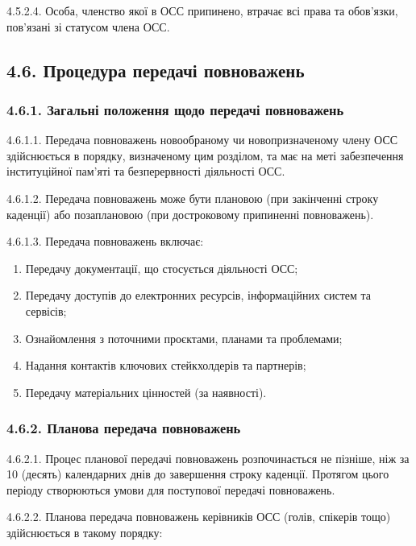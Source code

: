         4.5.2.4. Особа, членство якої в ОСС припинено, втрачає всі права та обов'язки, пов'язані зі статусом члена ОСС.

\subsection*{4.6. Процедура передачі повноважень}
    \subsubsection*{4.6.1. Загальні положення щодо передачі повноважень}
        4.6.1.1. Передача повноважень новообраному чи новопризначеному члену ОСС здійснюється в порядку, визначеному цим розділом, та має на меті забезпечення інституційної пам'яті та безперервності діяльності ОСС.
        
        4.6.1.2. Передача повноважень може бути плановою (при закінченні строку каденції) або позаплановою (при достроковому припиненні повноважень).
        
        4.6.1.3. Передача повноважень включає:

            \begin{enumerate}[label=\alph*)]
                \item Передачу документації, що стосується діяльності ОСС;
                \item Передачу доступів до електронних ресурсів, інформаційних систем та сервісів;
                \item Ознайомлення з поточними проєктами, планами та проблемами;
                \item Надання контактів ключових стейкхолдерів та партнерів;
                \item Передачу матеріальних цінностей (за наявності).
            \end{enumerate}

    \subsubsection*{4.6.2. Планова передача повноважень}
        4.6.2.1. Процес планової передачі повноважень розпочинається не пізніше, ніж за 10 (десять) календарних днів до завершення строку каденції. Протягом цього періоду створюються умови для поступової передачі повноважень.
        
        4.6.2.2. Планова передача повноважень керівників ОСС (голів, спікерів тощо) здійснюється в такому порядку:

